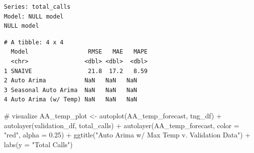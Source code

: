\documentclass[
  letterpaper,
  DIV=11,
  numbers=noendperiod]{scrartcl}
\newenvironment{Shaded}{\begin{snugshade}}{\end{snugshade}}
\newcommand{\AttributeTok}[1]{\textcolor[rgb]{0.40,0.45,0.13}{#1}}
\newcommand{\CommentTok}[1]{\textcolor[rgb]{0.37,0.37,0.37}{#1}}
\newcommand{\FloatTok}[1]{\textcolor[rgb]{0.68,0.00,0.00}{#1}}
\newcommand{\FunctionTok}[1]{\textcolor[rgb]{0.28,0.35,0.67}{#1}}
\newcommand{\NormalTok}[1]{\textcolor[rgb]{0.00,0.23,0.31}{#1}}
\newcommand{\OtherTok}[1]{\textcolor[rgb]{0.00,0.23,0.31}{#1}}
\newcommand{\SpecialCharTok}[1]{\textcolor[rgb]{0.37,0.37,0.37}{#1}}
\newcommand{\StringTok}[1]{\textcolor[rgb]{0.13,0.47,0.30}{#1}}
\begin{document}
\begin{verbatim}
Series: total_calls 
Model: NULL model 
NULL model
\end{verbatim}

\begin{Shaded}
\end{Shaded}

\begin{verbatim}
# A tibble: 4 x 4
  Model                 RMSE   MAE   MAPE
  <chr>                <dbl> <dbl>  <dbl>
1 SNAIVE                21.8  17.2   8.59
2 Auto Arima           NaN   NaN   NaN   
3 Seasonal Auto Arima  NaN   NaN   NaN   
4 Auto Arima (w/ Temp) NaN   NaN   NaN   
\end{verbatim}

\begin{Shaded}
\begin{Highlighting}[]
\CommentTok{\# visualize}
\NormalTok{AA\_temp\_plot }\OtherTok{\textless{}{-}} \FunctionTok{autoplot}\NormalTok{(AA\_temp\_forecast, tng\_df) }\SpecialCharTok{+} 
  \FunctionTok{autolayer}\NormalTok{(validation\_df, total\_calls) }\SpecialCharTok{+} 
  \FunctionTok{autolayer}\NormalTok{(AA\_temp\_forecast, }\AttributeTok{color =} \StringTok{"red"}\NormalTok{, }\AttributeTok{alpha =} \FloatTok{0.25}\NormalTok{) }\SpecialCharTok{+}
  \FunctionTok{ggtitle}\NormalTok{(}\StringTok{"Auto Arima w/ Max Temp v. Validation Data"}\NormalTok{) }\SpecialCharTok{+} 
  \FunctionTok{labs}\NormalTok{(}\AttributeTok{y =} \StringTok{"Total Calls"}\NormalTok{)}
\end{Highlighting}
\end{Shaded}
\end{document}
